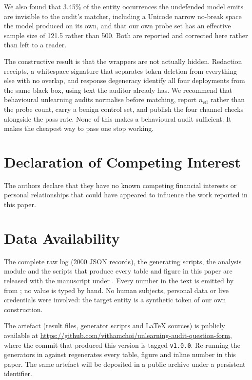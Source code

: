 \documentclass[journal]{IEEEtran}
\theoremstyle{definition}
\newcommand{\Nrows}{2000}
\newcommand{\Nper}{500}
\newcommand{\VarBlindNonePc}{3.45}
\newcommand{\NeffNone}{121.5}
\begin{document}
We also found that \VarBlindNonePc\% of the entity occurrences the undefended
model emits are
invisible to the audit's matcher, including a Unicode narrow no-break space the
model produced on its own, and that our own probe set has an effective sample
size of \NeffNone{} rather than \Nper{}. Both are reported and corrected here
rather than left to a reader.

The constructive result is that the wrappers are not actually hidden. Redaction
receipts, a whitespace signature that separates token deletion from everything
else with no overlap, and response degeneracy identify all four deployments from
the same black box, using text the auditor already has. We recommend that
behavioural unlearning audits normalise before matching, report
$n_{\mathrm{eff}}$ rather than the probe count, carry a benign control set, and
publish the four channel checks alongside the pass rate. None of this makes a
behavioural audit sufficient. It makes the cheapest way to pass one stop working.




\section*{Declaration of Competing Interest}

The authors declare that they have no known competing financial interests or
personal relationships that could have appeared to influence the work reported
in this paper.

\section*{Data Availability}

The complete raw log (\Nrows{} JSON records), the generating scripts, the
analysis module and the scripts that produce every table and figure in this paper
are released with the manuscript under
. Every number in the text is emitted by
 from ; no
value is typed by hand. No human subjects, personal data or live credentials were
involved: the target entity is a synthetic token of our own construction.

The artefact (result files, generator scripts and \LaTeX{} sources) is publicly
available at \url{https://github.com/vithamchoi/unlearning-audit-question-form}, where the commit that
produced this version is tagged \texttt{v1.0.0}. Re-running the generators in
 against  regenerates every table, figure and
inline number in this paper. The same artefact will be deposited in a public
archive under a persistent identifier.




\end{document}

